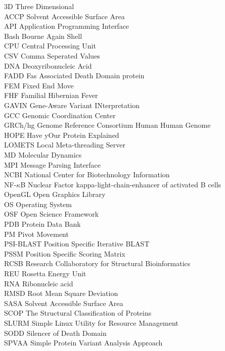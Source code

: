 3D Three Dimensional\\
ACCP Solvent Accessible Surface Area\\
API Application Programming Interface\\
Bash Bourne Again Shell\\
CPU Central Processing Unit\\
CSV Comma Seperated Values\\
DNA Deoxyribonucleic Acid\\
FADD Fas Associated Death Domain protein\\
FEM Fixed End Move\\
FHF Familial Hibernian Fever\\
GAVIN Gene-Aware Variant INterpretation\\
GCC Genomic Coordination Center\\
GRCh/hg Genome Reference Consortium Human Human Genome\\
HOPE Have yOur Protein Explained\\
LOMETS Local Meta-threading Server\\
MD	Molecular Dynamics\\
MPI Message Parsing Interface\\
NCBI National Center for Biotechnology Information\\
NF-$\kappa$B Nuclear Factor kappa-light-chain-enhancer of activated B cells\\
OpenGL Open Graphics Library\\
OS Operating System\\
OSF Open Science Framework\\
PDB Protein Data Bank\\
PM Pivot Movement\\
PSI-BLAST Position Specific Iterative BLAST\\
PSSM Position Specific Scoring Matrix\\
RCSB Research Collaboratory for Structural Bioinformatics\\
REU Rosetta Energy Unit\\
RNA Ribonucleic acid\\
RMSD Root Mean Square Deviation\\
SASA Solvent Accessible Surface Area\\
SCOP The Structural Classification of Proteins\\
SLURM Simple Linux Utility for Resource Management\\
SODD Silencer of Death Domain\\
SPVAA Simple Protein Variant Analysis Approach\\
